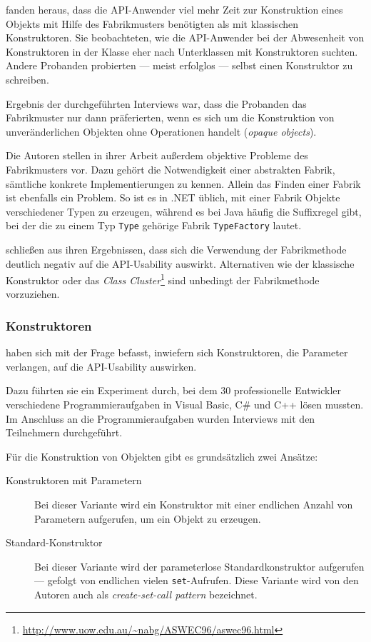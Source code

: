 \cite{Ellis:2007kv} fanden heraus, dass die API-Anwender viel mehr Zeit zur Konstruktion eines Objekts mit Hilfe des Fabrikmusters benötigten als mit klassischen Konstruktoren. Sie beobachteten, wie die API-Anwender bei der Abwesenheit von Konstruktoren in der Klasse eher nach Unterklassen mit Konstruktoren suchten. Andere Probanden probierten --- meist erfolglos --- selbst einen Konstruktor zu schreiben.

Ergebnis der durchgeführten Interviews war, dass die Probanden das Fabrikmuster nur dann präferierten, wenn es sich um die Konstruktion von unveränderlichen Objekten ohne Operationen handelt (\textit{opaque objects}).

Die Autoren stellen in ihrer Arbeit außerdem objektive Probleme des Fabrikmusters vor. Dazu gehört die Notwendigkeit einer abstrakten Fabrik, sämtliche konkrete Implementierungen zu kennen. Allein das Finden einer Fabrik ist ebenfalls ein Problem. So ist es in .NET üblich, mit einer Fabrik Objekte verschiedener Typen zu erzeugen, während es bei Java häufig die Suffixregel gibt, bei der die zu einem Typ \texttt{Type} gehörige Fabrik \texttt{TypeFactory} lautet.

\cite{Ellis:2007kv} schließen aus ihren Ergebnissen, dass sich die Verwendung der Fabrikmethode deutlich negativ auf die API-Usability auswirkt. Alternativen wie der klassische Konstruktor oder das \textit{Class Cluster}\footnote{\url{http://www.uow.edu.au/~nabg/ASWEC96/aswec96.html}} sind unbedingt der Fabrikmethode vorzuziehen.


\subsubsection{Konstruktoren}

\cite{Stylos:2007jb} haben sich mit der Frage befasst, inwiefern sich Konstruktoren, die Parameter verlangen, auf die API-Usability auswirken.

Dazu führten sie ein Experiment durch, bei dem 30 professionelle Entwickler verschiedene Programmieraufgaben in Visual Basic, C\# und C++ lösen mussten. Im Anschluss an die Programmieraufgaben wurden Interviews mit den Teilnehmern durchgeführt.

Für die Konstruktion von Objekten gibt es grundsätzlich zwei Ansätze:
\begin{description}
  \item[Konstruktoren mit Parametern] Bei dieser Variante wird ein Konstruktor mit einer endlichen Anzahl von Parametern aufgerufen, um ein Objekt zu erzeugen.
  \item[Standard-Konstruktor] Bei dieser Variante wird der parameterlose Standardkonstruktor aufgerufen --- gefolgt von endlichen vielen \texttt{set}-Aufrufen. Diese Variante wird von den Autoren auch als \textit{create-set-call pattern} bezeichnet.
\end{description}

